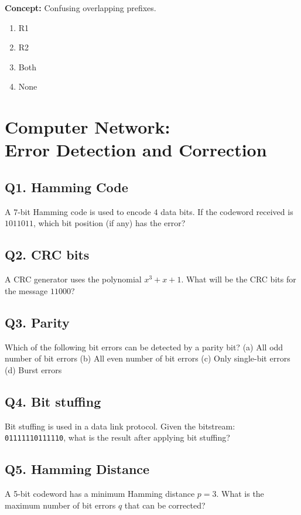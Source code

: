 \textbf{Concept:} Confusing overlapping prefixes.

\begin{enumerate}[label=(\alph*)]
\item R1 \quad \item R2 \quad \item Both \quad \item None
\end{enumerate}


\section[Computer Network: Error Detection and Correction]
{Computer Network:\\ Error Detection and Correction}

\subsection*{Q1. Hamming Code}
A $7$-bit Hamming code is used to encode $4$ data bits. If the codeword received is $1011011$, which bit position (if any) has the error?

\subsection*{Q2. CRC bits}
A CRC generator uses the polynomial $x^3 + x + 1$. What will be the CRC bits for the message $11000$?

\subsection*{Q3. Parity}
Which of the following bit errors can be detected by a parity bit?  
(a) All odd number of bit errors  
(b) All even number of bit errors  
(c) Only single-bit errors  
(d) Burst errors

\subsection*{Q4. Bit stuffing}
Bit stuffing is used in a data link protocol. Given the bitstream:\\ 
\texttt{01111110111110}, what is the result after applying bit stuffing?

\subsection*{Q5. Hamming Distance}
A 5-bit codeword has a minimum Hamming distance $p=3$. What is the maximum number of bit errors $q$ that can be corrected?

